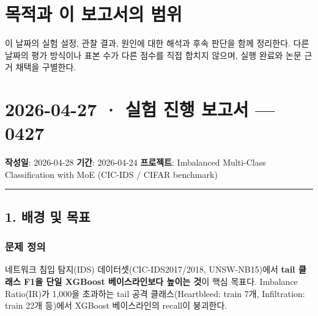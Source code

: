 




\section*{목적과 이 보고서의 범위}

이 날짜의 실험 설정, 관찰 결과, 원인에 대한 해석과 후속 판단을 함께 정리한다. 다른 날짜의 평가 방식이나 표본 수가 다른 점수를 직접 합치지 않으며, 실행 완료와 논문 근거 채택을 구별한다.


\section{2026-04-27 · 실험 진행 보고서 — 0427}
\label{report:20260427_0427}
\textbf{작성일}: 2026-04-28 \textbf{기간}: 2026-04-24 \textbf{프로젝트}: Imbalanced Multi-Class Classification with MoE (CIC-IDS /\allowbreak{} CIFAR benchmark)


\medskip\hrule\medskip
\subsection{1. 배경 및 목표}
\subsubsection{문제 정의}
네트워크 침입 탐지(IDS) 데이터셋(CIC-IDS2017/\allowbreak{}2018, UNSW-NB15)에서 \textbf{tail 클래스 F1을 단일 XGBoost 베이스라인보다 높이는 것}이 핵심 목표다. Imbalance Ratio(IR)가 1,000을 초과하는 tail 공격 클래스(Heartbleed: train 7개, Infiltration: train 22개 등)에서 XGBoost 베이스라인의 recall이 붕괴한다.


